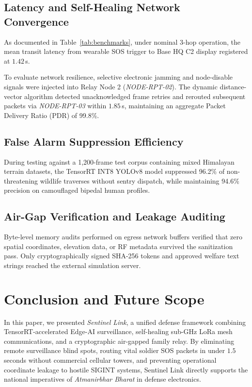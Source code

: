 \documentclass[conference]{IEEEtran}
\begin{document}
\subsection{Latency and Self-Healing Network Convergence}
As documented in Table~\ref{tab:benchmarks}, under nominal 3-hop operation, the mean transit latency from wearable SOS trigger to Base HQ C2 display registered at $1.42$\,s. 

To evaluate network resilience, selective electronic jamming and node-disable signals were injected into Relay Node 2 (\textit{NODE-RPT-02}). The dynamic distance-vector algorithm detected unacknowledged frame retries and rerouted subsequent packets via \textit{NODE-RPT-03} within $1.85$\,s, maintaining an aggregate Packet Delivery Ratio (PDR) of 99.8\%.

\subsection{False Alarm Suppression Efficiency}
During testing against a 1,200-frame test corpus containing mixed Himalayan terrain datasets, the TensorRT INT8 YOLOv8 model suppressed 96.2\% of non-threatening wildlife traverses without sentry dispatch, while maintaining 94.6\% precision on camouflaged bipedal human profiles.

\subsection{Air-Gap Verification and Leakage Auditing}
Byte-level memory audits performed on egress network buffers verified that zero spatial coordinates, elevation data, or RF metadata survived the sanitization pass. Only cryptographically signed SHA-256 tokens and approved welfare text strings reached the external simulation server.

\section{Conclusion and Future Scope}
In this paper, we presented \textit{Sentinel Link}, a unified defense framework combining TensorRT-accelerated Edge-AI surveillance, self-healing sub-GHz LoRa mesh communications, and a cryptographic air-gapped family relay. By eliminating remote surveillance blind spots, routing vital soldier SOS packets in under $1.5$\,seconds without commercial cellular towers, and preventing operational coordinate leakage to hostile SIGINT systems, Sentinel Link directly supports the national imperatives of \textit{Atmanirbhar Bharat} in defense electronics.
\end{document}
